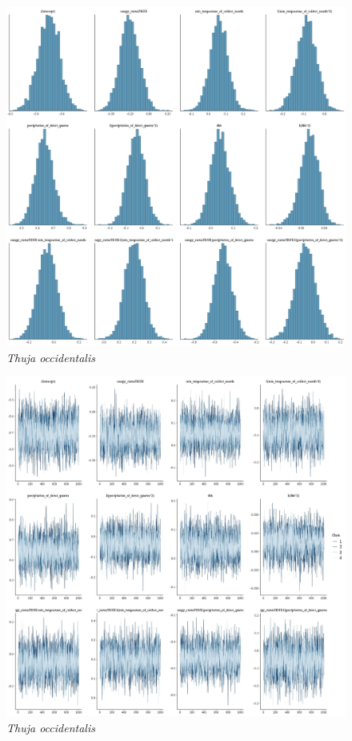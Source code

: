 \documentclass[letterpaper, 12pt]{article}
\begin{document}
\begin{figure}
	\centering
	\includegraphics[scale=0.4]{./505490-THU-OCC_hist}
	\caption{\textit{Thuja occidentalis}}
\end{figure}

\begin{figure}
	\centering
	\includegraphics[scale=0.4]{./505490-THU-OCC_traces}
	\caption{\textit{Thuja occidentalis}}
\end{figure}
\end{document}
